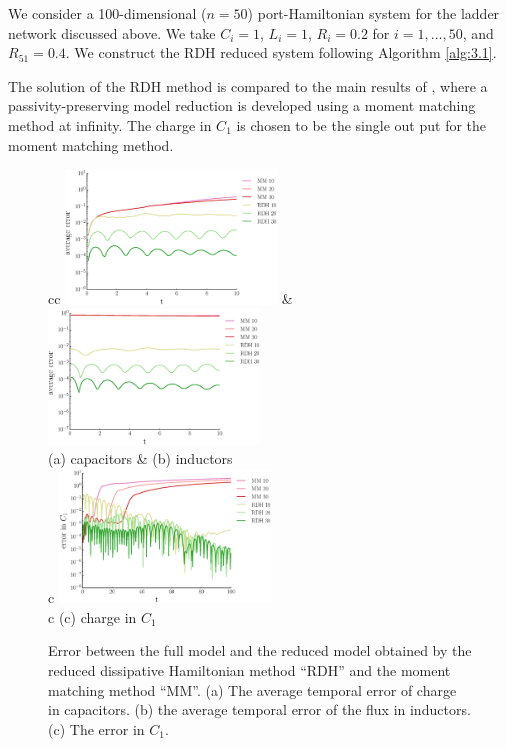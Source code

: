 We consider a 100-dimensional ($n=50$) port-Hamiltonian system for the ladder network discussed above. We take $C_i=1$, $L_i = 1$, $R_i=0.2$ for $i=1,\dots,50$, and $R_{51} = 0.4$. We construct the RDH reduced system following Algorithm \ref{alg:3.1}. 

The solution of the RDH method is compared to the main results of \cite{Polyuga:2010gj}, where a passivity-preserving model reduction is developed using a moment matching method at infinity. The charge in $C_1$ is chosen to be the single out put for the moment matching method.

\begin{figure}[t]
\begin{tabular}{cc}
\includegraphics[width=0.5\textwidth]{./figs/porthamil/error_capac} & 
\includegraphics[width=0.5\textwidth]{./figs/porthamil/error_flux} \\
(a) capacitors & (b) inductors \\
 {c} {\includegraphics[width=0.5\textwidth]{./figs/porthamil/error1}} \\
 {c} {(c) charge in $C_1$} 
\end{tabular}
\caption{Error between the full model and the reduced model obtained by the reduced dissipative Hamiltonian method ``RDH'' and the moment matching method ``MM''. (a) The average temporal error of charge in capacitors. (b) the average temporal error of the flux in inductors. (c) The error in $C_1$.} \label{fig:4.3}
\end{figure}

